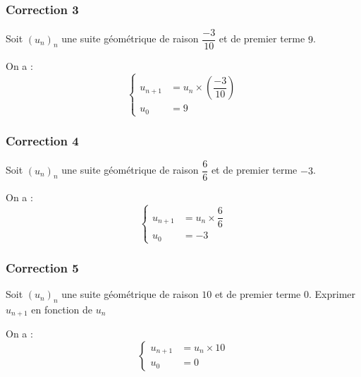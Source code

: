 \documentclass[15pt, mathserif]{beamer}
\begin{document}
\begin{frame}
\vspace{-10mm}
	\frametitle{Correction 3}
Soit $(u_n)_n$ une suite géométrique de raison $\dfrac{-3}{10}$ et de premier terme $9$. 
 
 On a : $$ \left\{ 
 \begin{array}{ll} 
 u_{n+1} &= u_n \times \left( \dfrac{-3}{10} \right) \\ 
 u_0 & = 9 
 \end{array} 
 \right. $$ 
 \end{frame}


\begin{frame}
\vspace{-10mm}
	\frametitle{Correction 4}
Soit $(u_n)_n$ une suite géométrique de raison $\dfrac{6}{6}$ et de premier terme $-3$. 
 
 On a : $$ \left\{ 
 \begin{array}{ll} 
 u_{n+1} &= u_n \times\dfrac{6}{6} \\ 
 u_0 & = -3 
 \end{array} 
 \right. $$ 
 \end{frame}


\begin{frame}
\vspace{-10mm}
	\frametitle{Correction 5}
Soit $(u_n)_n$ une suite géométrique de raison $10$ et de premier terme $0$. Exprimer $u_{n+1}$ en fonction de $u_n$ 
 
 On a : $$ \left\{ 
 \begin{array}{ll} 
 u_{n+1} &= u_n \times 10 \\ 
 u_0 & = 0 
 \end{array} 
 \right. $$ 
 \end{frame}
\end{document}
